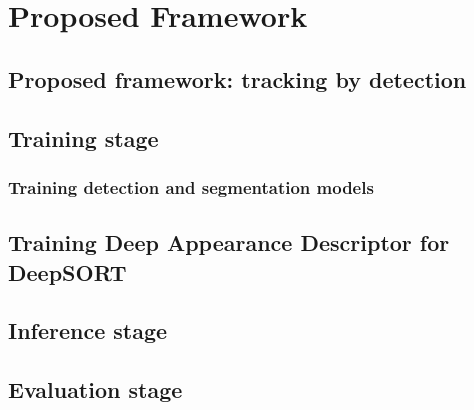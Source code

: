 \chapter{Proposed Framework}

\section{Proposed framework: tracking by detection}
\section{Training stage}
\subsection{Training detection and segmentation models}
\section{Training Deep Appearance Descriptor for DeepSORT}
\section{Inference stage}
\section{Evaluation stage}